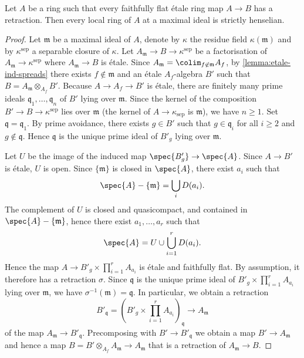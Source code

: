 \begin{lemma}
    Let $A$ be a ring such that every faithfully flat étale ring map $A \to B$ has
    a retraction. Then every local ring of $A$ at a maximal ideal is strictly henselian.
    \label{lemma:retractions-strictly-henselian}
\end{lemma}

\begin{proof}
    Let $\mathfrak{m}$ be a maximal ideal of $A$, denote by $\kappa$ the residue field $\kappa(\mathfrak{m})$
    and by $\kappa^{\mathrm{sep}}$ a separable closure of $\kappa$. Let
    $A_{\mathfrak{m}} \to B \to \kappa^{\mathrm{sep}}$ be a factorisation of $A_{\mathfrak{m}} \to \kappa^{\mathrm{sep}}$
    where $A_{\mathfrak{m}} \to B$ is étale. Since $A_{\mathfrak{m}} = \colim_{f \not\in \mathfrak{m}} A_f$,
    by \ref{lemma:etale-ind-spreads} there exists $f \not\in \mathfrak{m}$ and an étale $A_f$-algebra $B'$
    such that $B = A_{\mathfrak{m}} \otimes_{A_f} B'$.
    Because $A \to A_f \to B'$ is étale,
    there are finitely many prime ideals $\mathfrak{q}_1, \ldots, \mathfrak{q}_n$ of $B'$ lying over $\mathfrak{m}$.
    Since the kernel of the composition $B' \to B \to \kappa^{\mathrm{sep}}$ lies over $\mathfrak{m}$
    (the kernel of $A \to \kappa_{\mathrm{sep}}$ is $\mathfrak{m}$), we have $n \ge 1$.
    Set $\mathfrak{q} = \mathfrak{q}_1$. By prime avoidance, there exists $g \in B'$ such that
    $g \in \mathfrak{q}_i$ for all $i \ge 2$ and $g \not\in \mathfrak{q}$. Hence
    $\mathfrak{q}$ is the unique prime ideal of $B'_g$ lying over $\mathfrak{m}$.

    Let $U$ be the image of the induced map $\spec{B'_g} \to \spec{A}$. Since $A \to B'$ is étale, $U$ is open.
    Since $\{\mathfrak{m}\}$ is closed in $\spec{A}$, there exist $a_i$ such that
    \[
        \spec{A} - \{\mathfrak{m}\} = \bigcup_{i} D(a_i)
    .\] The complement of $U$ is closed and quasicompact, and contained in $\spec{A} - \{\mathfrak{m}\}$, hence
    there exist $a_1, \ldots, a_r$ such that
    \[
        \spec{A} = U \cup \bigcup_{i=1}^r D(a_i)
    .\] Hence the map $A \to B'_g \times \prod_{i=1}^{r} A_{a_i}$ is étale and faithfully flat. By assumption,
    it therefore has a retraction $\sigma$. Since $\mathfrak{q}$ is the unique prime ideal of $B'_g \times \prod_{i=1}^{r} A_{a_i}$
    lying over $\mathfrak{m}$, we have $\sigma^{-1}(\mathfrak{m}) = \mathfrak{q}$. In particular,
    we obtain a retraction
    \[
        B'_{\mathfrak{q}} = \left(B'_g \times \prod_{i=1}^{r} A_{a_i}\right)_{\mathfrak{q}} \to A_{\mathfrak{m}}
    \] of the map $A_{\mathfrak{m}} \to B'_{\mathfrak{q}}$. Precomposing with $B' \to B'_{\mathfrak{q}}$ we obtain
    a map $B' \to A_{\mathfrak{m}}$ and hence a map
    $B = B' \otimes_{A_f} A_{\mathfrak{m}} \to A_{\mathfrak{m}}$ that is a retraction of $A_{\mathfrak{m}} \to B$.
\end{proof}

